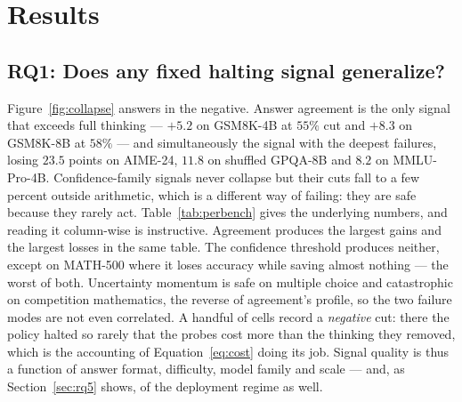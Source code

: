 \documentclass[acmsmall]{acmart}
\theoremstyle{acmdefinition}%
\theoremstyle{acmplain}}{}%
\begin{document}
\section{Results}\label{sec:results}

\subsection{RQ1: Does any fixed halting signal generalize?}\label{sec:rq1}
Figure~\ref{fig:collapse} answers in the negative. Answer agreement is the only signal that exceeds full thinking --- $+5.2$ on GSM8K-4B at $55\%$ cut and $+8.3$ on GSM8K-8B at $58\%$ --- and simultaneously the signal with the deepest failures, losing $23.5$ points on AIME-24, $11.8$ on shuffled GPQA-8B and $8.2$ on MMLU-Pro-4B. Confidence-family signals never collapse but their cuts fall to a few percent outside arithmetic, which is a different way of failing: they are safe because they rarely act. Table~\ref{tab:perbench} gives the underlying numbers, and reading it column-wise is instructive. Agreement produces the largest gains and the largest losses in the same table. The confidence threshold produces neither, except on MATH-500 where it loses accuracy while saving almost nothing --- the worst of both. Uncertainty momentum is safe on multiple choice and catastrophic on competition mathematics, the reverse of agreement's profile, so the two failure modes are not even correlated. A handful of cells record a \emph{negative} cut: there the policy halted so rarely that the probes cost more than the thinking they removed, which is the accounting of Equation~\eqref{eq:cost} doing its job. Signal quality is thus a function of answer format, difficulty, model family and scale --- and, as Section~\ref{sec:rq5} shows, of the deployment regime as well.
\end{document}
